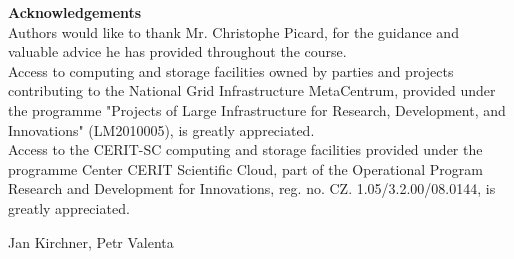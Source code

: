 \documentclass[a4paper, 10pt]{article}
\begin{document}
{\bf \noindent Acknowledgements} \\

Authors would like to thank Mr. Christophe Picard, for the guidance and valuable advice he has provided throughout the course.\\

Access to computing and storage facilities owned by parties and projects contributing to the National Grid Infrastructure MetaCentrum, provided under the programme "Projects of Large Infrastructure for Research, Development, and Innovations" (LM2010005), is greatly appreciated.\\

Access to the CERIT-SC computing and storage facilities provided under the programme Center CERIT Scientific Cloud, part of the Operational Program Research and Development for Innovations, reg. no. CZ. 1.05/3.2.00/08.0144, is greatly  appreciated.\\
\begin{flushright}
	Jan Kirchner, Petr Valenta
\end{flushright}



\end{document}
